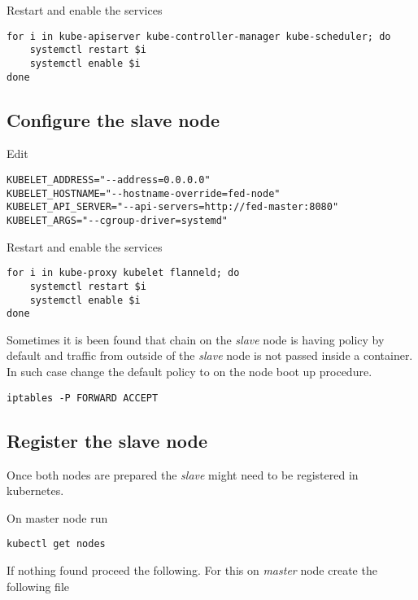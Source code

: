 Restart and enable the services

\begin{lstlisting}
for i in kube-apiserver kube-controller-manager kube-scheduler; do
    systemctl restart $i
    systemctl enable $i
done
\end{lstlisting}

\subsection{Configure the slave node}
\label{subsec:setup-kuber-slave}

Edit 

\begin{lstlisting}
KUBELET_ADDRESS="--address=0.0.0.0"
KUBELET_HOSTNAME="--hostname-override=fed-node"
KUBELET_API_SERVER="--api-servers=http://fed-master:8080"
KUBELET_ARGS="--cgroup-driver=systemd"
\end{lstlisting}

Restart and enable the services

\begin{lstlisting}
for i in kube-proxy kubelet flanneld; do
    systemctl restart $i
    systemctl enable $i
done
\end{lstlisting}

Sometimes it is been found that  chain on
the \emph{slave} node is having  policy by default
and traffic from outside of the \emph{slave} node is not
passed inside a container. In such case change the default
policy to  on the node boot up procedure.

\begin{lstlisting}
iptables -P FORWARD ACCEPT
\end{lstlisting}

\subsection{Register the slave node}
\label{subsec:setup-kuber-register-slave}

Once both nodes are prepared the \emph{slave} might need
to be registered in kubernetes.

On master node run

\begin{lstlisting}
kubectl get nodes
\end{lstlisting}

If nothing found proceed the following. For this on
\emph{master} node create the following 
file

